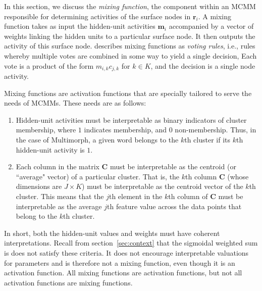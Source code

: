 In this section, we discuss the \emph{mixing function}, 
the component within an MCMM responsible for determining 
activities of the surface nodes in $\textbf{r}_i$.
A mixing function takes as input the hidden-unit activities $\textbf{m}_i$ accompanied by a vector of weights  
linking the hidden units to a particular surface node. It then outputs the activity 
of this surface node. 
\citet{saund:94} describes mixing functions as
\emph{voting rules}, i.e., rules whereby multiple votes are combined in some way to yield a single decision, 
Each vote is a product of the form $m_{i,k}c_{j,k}$ for $k \in K$, and the decision is a single node activity. 

Mixing functions are 
activation functions that are specially tailored to serve the needs of MCMMs. 
These needs are as follows:
\begin{enumerate}
\item Hidden-unit activities 
must be interpretable as binary indicators of cluster membership, where $1$ 
indicates membership, and $0$ non-membership. Thus, in the case of 
Multimorph, a given word belongs to the 
$k$th cluster if its $k$th hidden-unit activity is $1$.
\item Each column in the matrix $\textbf{C}$ must be interpretable as the centroid 
(or ``average" vector) of a particular cluster. That is, the $k$th column 
$\textbf{C}$ (whose dimensions are $J \times K$) must be interpretable as the centroid vector of the $k$th cluster. This means that the $j$th element in the $k$th column of $\textbf{C}$ must be interpretable as the average $j$th feature value across the data points that belong to the $k$th cluster. 
\end{enumerate}
In short, both the hidden-unit values and weights must have coherent interpretations. 
Recall from section~\ref{sec:context} that the sigmoidal weighted sum is 
 does not satisfy these criteria. It does not encourage 
interpretable valuations for parameters and is therefore 
not a mixing function, even though it is an activation function.  All mixing functions
are activation functions, but not all activation functions are mixing functions.

